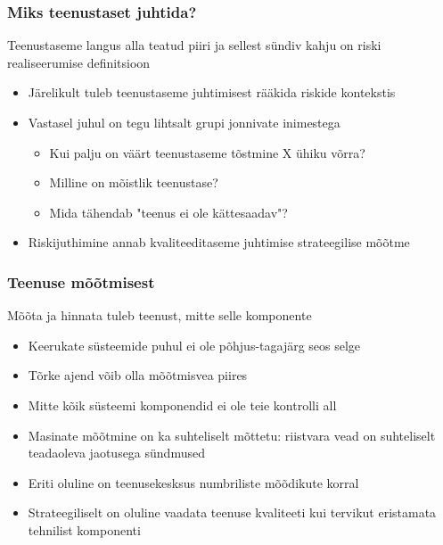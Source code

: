 \begin{frame}[fragile]
  \frametitle{Miks teenustaset juhtida?}
  	Teenustaseme langus alla teatud piiri ja sellest sündiv kahju on riski realiseerumise definitsioon
		\begin{itemize}
			\item Järelikult tuleb teenustaseme juhtimisest rääkida riskide kontekstis
			\item Vastasel juhul on tegu lihtsalt grupi jonnivate inimestega
			\begin{itemize}
				\item Kui palju on väärt teenustaseme tõstmine X ühiku võrra?
				\item Milline on mõistlik teenustase?
				\item Mida tähendab "teenus ei ole kättesaadav"?
			\end{itemize}
			\item Riskijuthimine annab kvaliteeditaseme juhtimise strateegilise mõõtme 
		\end{itemize}		
\end{frame}

\begin{frame}[fragile]
  \frametitle{Teenuse mõõtmisest}
  	Mõõta ja hinnata tuleb teenust, mitte selle komponente
		\begin{itemize}
			\item Keerukate süsteemide puhul ei ole põhjus-tagajärg seos selge
			\item Tõrke ajend võib olla mõõtmisvea piires
			\item Mitte kõik süsteemi komponendid ei ole teie kontrolli all
			\item Masinate mõõtmine on ka suhteliselt mõttetu: riistvara vead on suhteliselt teadaoleva jaotusega sündmused
			\item Eriti oluline on teenusekesksus numbriliste mõõdikute korral
			\item Strateegiliselt on oluline vaadata teenuse kvaliteeti kui tervikut eristamata tehnilist komponenti
		\end{itemize}		
\end{frame}

